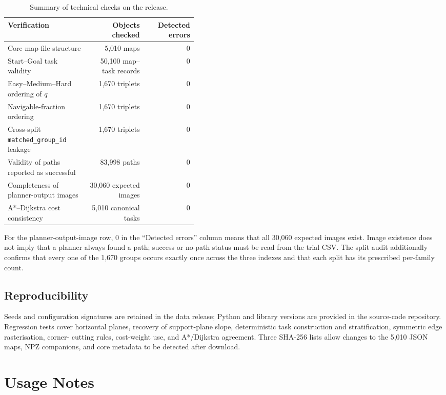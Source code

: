 \documentclass[11pt]{article}
\begin{document}
\begin{table}[htbp]
  \centering
  \caption{Summary of technical checks on the release.}
  \label{tab:validation-summary}
  \small
  \begin{tabular}{L{0.43\linewidth}r r}
    \toprule
    Verification & Objects checked & Detected errors \\
    \midrule
    Core map-file structure & 5,010 maps & 0 \\
    Start--Goal task validity & 50,100 map--task records & 0 \\
    Easy--Medium--Hard ordering of $q$ & 1,670 triplets & 0 \\
    Navigable-fraction ordering & 1,670 triplets & 0 \\
    Cross-split \texttt{matched\_group\_id} leakage & 1,670 triplets & 0 \\
    Validity of paths reported as successful & 83,998 paths & 0 \\
    Completeness of planner-output images & 30,060 expected images & 0 \\
    A*--Dijkstra cost consistency & 5,010 canonical tasks & 0 \\
    \bottomrule
  \end{tabular}
\end{table}

For the planner-output-image row, 0 in the ``Detected errors'' column means that
all 30,060 expected images exist. Image existence does not imply that a planner
always found a path; success or no-path status must be read from the trial CSV.
The split audit additionally confirms that every one of the 1,670 groups occurs
exactly once across the three indexes and that each split has its prescribed
per-family count.

\subsection{Reproducibility}

Seeds and configuration signatures are retained in the data release; Python
and library versions are provided in the source-code repository. Regression
tests cover horizontal planes, recovery of support-plane slope, deterministic
task construction and stratification, symmetric edge rasterisation, corner-
cutting rules, cost-weight use, and A*/Dijkstra agreement. Three SHA-256 lists
allow changes to the 5,010 JSON maps, NPZ companions, and core metadata to be
detected after download.

\section{Usage Notes}
\end{document}
